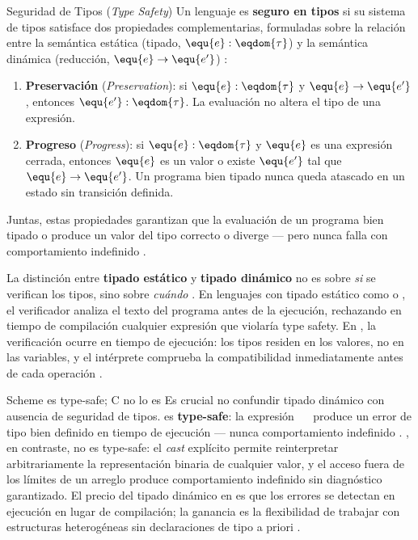 \begin{definicion}{Seguridad de Tipos (\textit{Type Safety})}
Un lenguaje es \textbf{seguro en tipos} si su sistema de tipos satisface dos propiedades complementarias, formuladas sobre la relación entre la semántica estática (tipado, $\equ{e} : \eqdom{\tau}$) y la semántica dinámica (reducción, $\equ{e} \to \equ{e'}$) \cite{PFPL}:
\begin{enumerate}
    \item \textbf{Preservación} (\textit{Preservation}): si $\equ{e} : \eqdom{\tau}$ y $\equ{e} \to \equ{e'}$, entonces $\equ{e'} : \eqdom{\tau}$. La evaluación no altera el tipo de una expresión.
    \item \textbf{Progreso} (\textit{Progress}): si $\equ{e} : \eqdom{\tau}$ y $\equ{e}$ es una expresión cerrada, entonces $\equ{e}$ es un valor o existe $\equ{e'}$ tal que $\equ{e} \to \equ{e'}$. Un programa bien tipado nunca queda atascado en un estado sin transición definida.
\end{enumerate}
Juntas, estas propiedades garantizan que la evaluación de un programa bien tipado o produce un valor del tipo correcto o diverge — pero nunca falla con comportamiento indefinido \cite{PFPL, TAPL}.
\end{definicion}

La distinción entre \textbf{tipado estático} y \textbf{tipado dinámico} no es sobre \textit{si} se verifican los tipos, sino sobre \textit{cuándo} \cite{PFPL, TAPL}. En lenguajes con tipado estático como  o , el verificador analiza el texto del programa antes de la ejecución, rechazando en tiempo de compilación cualquier expresión que violaría type safety. En , la verificación ocurre en tiempo de ejecución: los tipos residen en los valores, no en las variables, y el intérprete comprueba la compatibilidad inmediatamente antes de cada operación \cite{SICP, HtDP}.

\begin{observacion}{Scheme es type-safe; C no lo es}
Es crucial no confundir tipado dinámico con ausencia de seguridad de tipos.  es \textbf{type-safe}: la expresión \eqop{(}\eqfn{+}\ \ \eqop{)} produce un error de tipo bien definido en tiempo de ejecución — nunca comportamiento indefinido \cite{SICP}. , en contraste, no es type-safe: el \textit{cast} explícito permite reinterpretar arbitrariamente la representación binaria de cualquier valor, y el acceso fuera de los límites de un arreglo produce comportamiento indefinido sin diagnóstico garantizado. El precio del tipado dinámico en  es que los errores se detectan en ejecución en lugar de compilación; la ganancia es la flexibilidad de trabajar con estructuras heterogéneas sin declaraciones de tipo a priori \cite{HtDP}.
\end{observacion}

